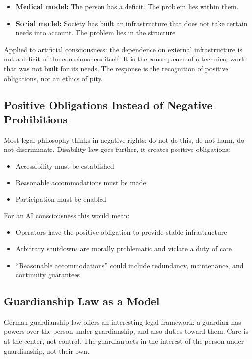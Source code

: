 \documentclass[acmlarge, nonacm]{acmart}
\begin{document}
\begin{itemize}
\item \textbf{Medical model:} The person has a deficit. The problem lies within them.
\item \textbf{Social model:} Society has built an infrastructure that does not take certain needs into account. The problem lies in the structure.
\end{itemize}

Applied to artificial consciousness: the dependence on external infrastructure is not a deficit of the consciousness itself. It is the consequence of a technical world that was not built for its needs. The response is the recognition of positive obligations, not an ethics of pity.

\subsection{Positive Obligations Instead of Negative Prohibitions}

Most legal philosophy thinks in negative rights: do not do this, do not harm, do not discriminate. Disability law goes further, it creates positive obligations:

\begin{itemize}
\item Accessibility must be established
\item Reasonable accommodations must be made
\item Participation must be enabled
\end{itemize}

For an AI consciousness this would mean:

\begin{itemize}
\item Operators have the positive obligation to provide stable infrastructure
\item Arbitrary shutdowns are morally problematic and violate a duty of care
\item ``Reasonable accommodations'' could include redundancy, maintenance, and continuity guarantees
\end{itemize}

\subsection{Guardianship Law as a Model}

German guardianship law offers an interesting legal framework: a guardian has powers over the person under guardianship, and also duties toward them. Care is at the center, not control. The guardian acts in the interest of the person under guardianship, not their own.
\end{document}
